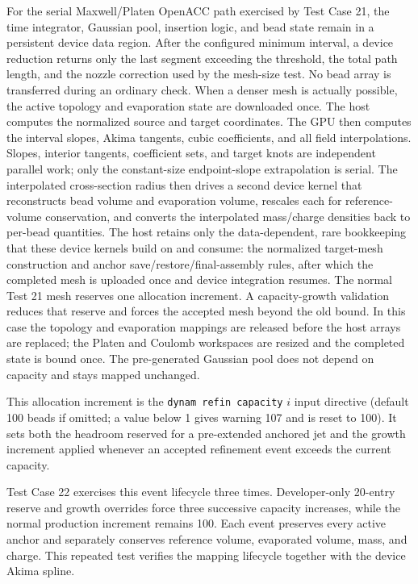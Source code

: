 For the serial Maxwell/Platen OpenACC path exercised by Test Case 21, the
time integrator, Gaussian pool, insertion logic, and bead state remain in a
persistent device data region. After the configured minimum interval, a
device reduction returns only the last segment exceeding the threshold, the
total path length, and the nozzle correction used by the mesh-size test. No
bead array is transferred during an ordinary check. When a denser mesh is
actually possible, the active topology and evaporation state are downloaded
once. The host computes the normalized source and target coordinates. The GPU
then computes the interval slopes, Akima tangents, cubic coefficients, and all
field interpolations. Slopes, interior tangents, coefficient sets, and target
knots are independent parallel work; only the constant-size endpoint-slope
extrapolation is serial. The interpolated cross-section radius then drives a
second device kernel that reconstructs bead volume and evaporation volume,
rescales each for reference-volume conservation, and converts the
interpolated mass/charge densities back to per-bead quantities. The host
retains only the data-dependent, rare bookkeeping that these device kernels
build on and consume: the normalized target-mesh construction and anchor
save/restore/final-assembly rules, after
which the completed mesh is uploaded once and device integration resumes. The
normal Test 21 mesh reserves one allocation increment. A capacity-growth
validation reduces that reserve and forces the accepted mesh beyond the old
bound. In this case the topology and evaporation mappings are released before
the host arrays are replaced; the Platen and Coulomb workspaces are resized
and the completed state is bound once. The pre-generated Gaussian pool does
not depend on capacity and stays mapped unchanged.

This allocation increment is the \texttt{dynam refin capacity} $i$ input
directive (default 100 beads if omitted; a value below 1 gives warning 107
and is reset to 100). It sets
both the headroom reserved for a pre-extended anchored jet and the growth
increment applied whenever an accepted refinement event exceeds the current
capacity.

Test Case 22 exercises this event lifecycle three times. Developer-only
20-entry reserve and growth overrides force three successive capacity
increases, while the normal production increment remains 100. Each event
preserves every active anchor and separately conserves reference volume,
evaporated volume, mass, and charge. This repeated test verifies the mapping
lifecycle together with the device Akima spline.

